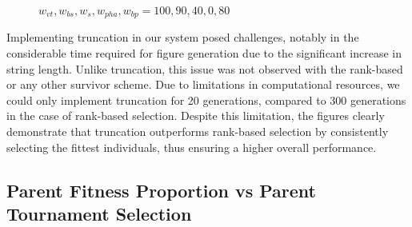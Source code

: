 \begin{figure}[H]
    \vspace{0.5cm}
    \caption{$w_{vt}, w_{bs}, w_{s}, w_{pha}, w_{bp} = 100, 90, 40, 0, 80$}
    \label{fig:mutation_comparison}
\end{figure}

Implementing truncation in our system posed challenges, notably in the considerable time required for figure generation due to the significant increase in string length. Unlike truncation, this issue was not observed with the rank-based or any other survivor scheme. Due to limitations in computational resources, we could only implement truncation for 20 generations, compared to 300 generations in the case of rank-based selection. Despite this limitation, the figures clearly demonstrate that truncation outperforms rank-based selection by consistently selecting the fittest individuals, thus ensuring a higher overall performance.

\subsection{Parent Fitness Proportion vs Parent Tournament Selection}

